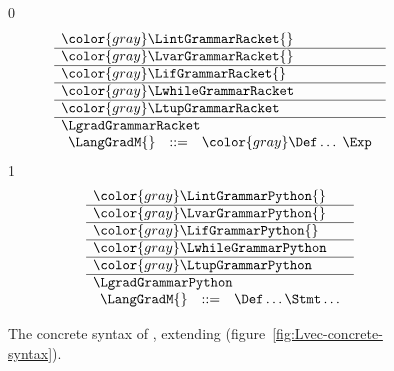 \documentclass[7x10]{TimesAPriori_MIT}%
\newcommand{\gray}[1]{{\color{gray} #1}}
\def\racketEd{0}
\def\pythonEd{1}
\providecommand{\BookEdition}{1}
\let\edition\BookEdition
\newcommand{\pythonColor}[0]{}
\numberwithin{theorem}{chapter}
\numberwithin{definition}{chapter}
\numberwithin{equation}{chapter}
\begin{document}
\begin{figure}[tbp]
\centering
\begin{tcolorbox}[colback=white]
  \vspace{-5pt}
    \small
{\if\edition\racketEd    
\[
\begin{array}{l}
  \gray{\LintGrammarRacket{}} \\ \hline
  \gray{\LvarGrammarRacket{}} \\ \hline
  \gray{\LifGrammarRacket{}} \\ \hline
  \gray{\LwhileGrammarRacket} \\ \hline
  \gray{\LtupGrammarRacket} \\   \hline
  \LgradGrammarRacket \\
\begin{array}{lcl}
  \LangGradM{} &::=& \gray{\Def\ldots \; \Exp}
\end{array}
\end{array}
\]
\fi}
{\if\edition\pythonEd\pythonColor
\[
\begin{array}{l}
  \gray{\LintGrammarPython{}} \\ \hline
  \gray{\LvarGrammarPython{}} \\ \hline
  \gray{\LifGrammarPython{}} \\ \hline
  \gray{\LwhileGrammarPython} \\ \hline
  \gray{\LtupGrammarPython} \\   \hline
  \LgradGrammarPython \\
  \begin{array}{lcl}
    \LangGradM{} &::=& \Def\ldots \Stmt\ldots
  \end{array}
\end{array}
\]
\fi}
\end{tcolorbox}

\caption{The concrete syntax of \LangGrad{}, extending \LangVec{} (figure~\ref{fig:Lvec-concrete-syntax}).}
\label{fig:Lgrad-concrete-syntax}
\end{figure}
\end{document}
